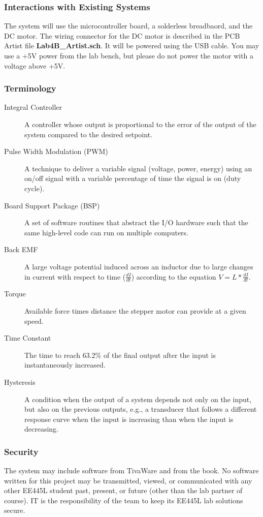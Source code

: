 \documentclass{article}
\begin{document}
		\subsubsection{Interactions with Existing Systems}
			The system will use the microcontroller board, a solderless breadbaord, and the DC motor. The wiring connector for the DC motor is described in the PCB Artist file \textbf{Lab4B\_Artist.sch}. It will be powered using the USB cable. You may use a +5V power from the lab bench, but please do not power the motor with a voltage above +5V. 
		\subsubsection{Terminology}
			\begin{description}
				\item[Integral Controller]
					A controller whose output is proportional to the error of the output of the system compared to the desired setpoint.
				\item[Pulse Width Modulation (PWM)]
					A technique to deliver a variable signal (voltage, power, energy) using an on/off signal with a variable percentage of time the signal is on (duty cycle).
				\item[Board Support Package (BSP)]
					A set of software routines that abstract the I/O hardware such that the same high-level code can run on multiple computers.
				\item[Back EMF]
					A large voltage potential induced across an inductor due to large changes in current with respect to time ($\frac{dI}{dt}$) according to the equation $V=L*\frac{dI}{dt}$.
				\item[Torque]
					Available force times distance the stepper motor can provide at a given speed.
				\item[Time Constant]
					The time to reach 63.2\% of the final output after the input is instantaneously increased.
				\item[Hysteresis]
					A condition when the output of a system depends not only on the input, but also on the previous outputs, e.g., a transducer that follows a different response curve when the input is increasing than when the input is decreasing.
			\end{description}
		\subsubsection{Security}
			The system may include software from TivaWare and from the book. No software written for this project may be transmitted, viewed, or communicated with any other EE445L student past, present, or future (other than the lab partner of course). IT is the responsibility of the team to keep its EE445L lab solutions secure.
\end{document}
